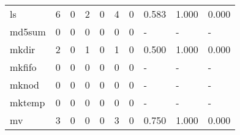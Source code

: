 \begin{longtable}{lp{1.3cm}p{1.3cm}p{1.3cm}p{1.3cm}p{1.3cm}p{1.3cm}p{1.3cm}p{1.3cm}p{1.3cm}}
ls        &                      6 &                                             0 &                                            2 &                                           0 &                                            4 &                                          0 &                                0.583 &                                  1.000 &                                0.000 \\
md5sum    &                      0 &                                             0 &                                            0 &                                           0 &                                            0 &                                          0 &                                    - &                                      - &                                    - \\
mkdir     &                      2 &                                             0 &                                            1 &                                           0 &                                            1 &                                          0 &                                0.500 &                                  1.000 &                                0.000 \\
mkfifo    &                      0 &                                             0 &                                            0 &                                           0 &                                            0 &                                          0 &                                    - &                                      - &                                    - \\
mknod     &                      0 &                                             0 &                                            0 &                                           0 &                                            0 &                                          0 &                                    - &                                      - &                                    - \\
mktemp    &                      0 &                                             0 &                                            0 &                                           0 &                                            0 &                                          0 &                                    - &                                      - &                                    - \\
mv        &                      3 &                                             0 &                                            0 &                                           0 &                                            3 &                                          0 &                                0.750 &                                  1.000 &                                0.000 \\

\end{longtable}
